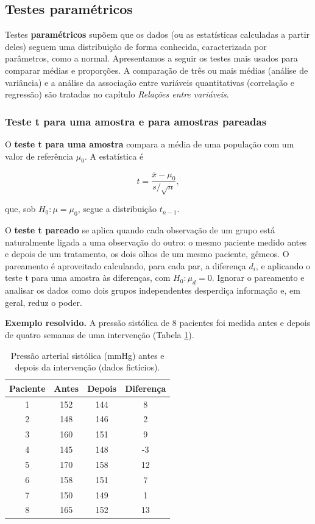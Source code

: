 \documentclass[
]{book}
\begin{document}
\subsection{Testes paramétricos}\label{testes-paramuxe9tricos}

Testes \textbf{paramétricos} supõem que os dados (ou as estatísticas calculadas a partir deles) seguem uma distribuição de forma conhecida, caracterizada por parâmetros, como a normal. Apresentamos a seguir os testes mais usados para comparar médias e proporções. A comparação de três ou mais médias (análise de variância) e a análise da associação entre variáveis quantitativas (correlação e regressão) são tratadas no capítulo \emph{Relações entre variáveis}.

\subsubsection{Teste t para uma amostra e para amostras pareadas}\label{teste-t-para-uma-amostra-e-para-amostras-pareadas}

O \textbf{teste t para uma amostra} compara a média de uma população com um valor de referência \(\mu_0\). A estatística é

\[
t = \frac{\bar{x} - \mu_0}{s/\sqrt{n}},
\]

que, sob \(H_0\colon \mu = \mu_0\), segue a distribuição \(t_{n-1}\).

O \textbf{teste t pareado} se aplica quando cada observação de um grupo está naturalmente ligada a uma observação do outro: o mesmo paciente medido antes e depois de um tratamento, os dois olhos de um mesmo paciente, gêmeos. O pareamento é aproveitado calculando, para cada par, a diferença \(d_i\), e aplicando o teste t para uma amostra às diferenças, com \(H_0\colon \mu_d = 0\). Ignorar o pareamento e analisar os dados como dois grupos independentes desperdiça informação e, em geral, reduz o poder.

\textbf{Exemplo resolvido.} A pressão sistólica de 8 pacientes foi medida antes e depois de quatro semanas de uma intervenção (Tabela \ref{tab:inf-pareado}).

\begin{table}

\caption{\label{tab:inf-pareado}Pressão arterial sistólica (mmHg) antes e depois da intervenção (dados fictícios).}
\centering
\begin{tabular}[t]{c|c|c|c}
\hline
Paciente & Antes & Depois & Diferença\\
\hline
1 & 152 & 144 & 8\\
\hline
2 & 148 & 146 & 2\\
\hline
3 & 160 & 151 & 9\\
\hline
4 & 145 & 148 & -3\\
\hline
5 & 170 & 158 & 12\\
\hline
6 & 158 & 151 & 7\\
\hline
7 & 150 & 149 & 1\\
\hline
8 & 165 & 152 & 13\\
\hline
\end{tabular}
\end{table}
\end{document}
